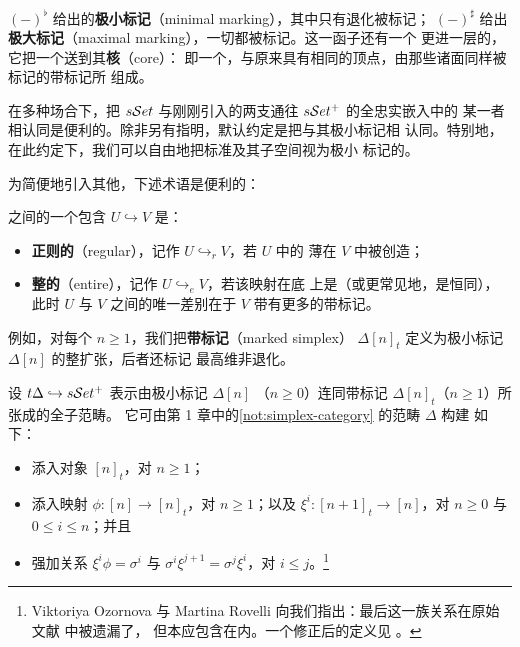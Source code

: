 \trLeftAdjoint{} $(-)^{\flat}$ 给出\trSimplicialSet{}的\textbf{极小标记}（minimal
marking），其中只有退化\trSimplex{}被标记；\trRightAdjoint{} $(-)^{\sharp}$ 给出
\textbf{极大标记}（maximal marking），一切\trSimplex{}都被标记。这一函子还有一个
更进一层的\trRightAdjoint，它把一个\trMarkedSimplicialSet{}送到其\textbf{核}（core）：
即一个\trSimplicialSet{}，与原来具有相同的顶点，由那些诸面同样被标记的带标记\trSimplex{}所
组成。

在多种场合下，把 $s\mathcal{S}et$ 与刚刚引入的两支通往 $s\mathcal{S}et^{+}$ 的全忠实嵌入中的
某一者相认同是便利的。除非另有指明，默认约定是把\trSimplicialSet{}与其极小标记相
认同。特别地，在此约定下，我们可以自由地把标准\trSimplex{}及其子空间视为极小
标记的\trMarkedSimplicialSet{}。

为简便地引入其他\trMarkedSimplicialSet{}，下述术语是便利的：

\begin{definition}\label{def:regular-entire-inclusions}
\trMarkedSimplicialSet{}之间的一个包含 $U\hookrightarrow V$ 是：
\begin{itemize}
\item \textbf{正则的}（regular），记作 $U\hookrightarrow_{r}V$，若 $U$ 中的
  薄\trSimplex{}在 $V$ 中被创造；
\item \textbf{整的}（entire），记作 $U\hookrightarrow_{e}V$，若该映射在底%
  \trSimplicialSet{}上是\trIsomorphism（或更常见地，是恒同），此时 $U$ 与
  $V$ 之间的唯一差别在于 $V$ 带有更多的带标记\trSimplex{}。
\end{itemize}
\end{definition}

例如，对每个 $n\ge 1$，我们把\textbf{带标记\trSimplex}（marked simplex）
$\Delta[n]_{t}$ 定义为极小标记\trSimplex{} $\Delta[n]$ 的整扩张，后者还标记
最高维非退化\trSimplex{}。

\begin{notation}\label{not:marked-simplex-category}
设 $t\Delta\hookrightarrow s\mathcal{S}et^{+}$ 表示由极小标记\trSimplex{} $\Delta[n]$
（$n\ge 0$）连同带标记\trSimplex{} $\Delta[n]_{t}$（$n\ge 1$）所张成的全子范畴。
它可由第 1 章中的\cref{not:simplex-category} 的\trSimplex{}范畴 $\Delta$ 构建
如下：
\begin{itemize}
\item 添入对象 $[n]_{t}$，对 $n\ge 1$；
\item 添入映射 $\phi\colon[n]\to[n]_{t}$，对 $n\ge 1$；以及
  $\xi^{i}\colon[n+1]_{t}\to[n]$，对 $n\ge 0$ 与 $0\le i\le n$；并且
\item 强加关系 $\xi^{i}\phi=\sigma^{i}$ 与%
  $\sigma^{i}\xi^{j+1}=\sigma^{j}\xi^{i}$，对 $i\le j$。\footnote{Viktoriya Ozornova 与 Martina
  Rovelli 向我们指出：最后这一族关系在原始文献 \cite{bib122} 中被遗漏了，
  但本应包含在内。一个修正后的定义见 \cite[1.1]{bib89}。}
\end{itemize}
\end{notation}

